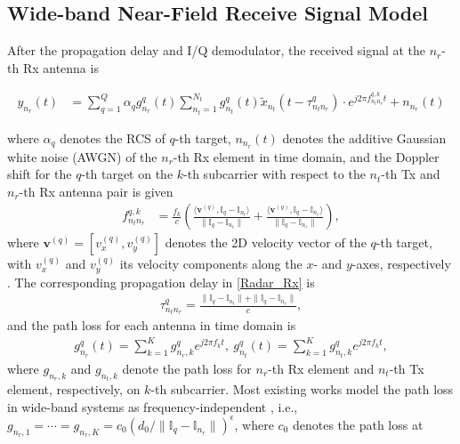 \documentclass[9pt,final,journal,twocolumn]{IEEEtran}
\begin{document}
\subsection{Wide-band Near-Field Receive Signal Model}
\vspace{-0.1cm}
After the propagation delay and I/Q demodulator, the received signal at the $n_r$-th Rx antenna is
\begin{small}
\begin{align}\label{Radar_Rx}
   y_{n_r}(t) &\!=\! \sum_{q=1}^{Q}{\alpha}_q g_{n_r}^q(t)
    \sum_{n_t=1}^{N_t}g_{n_t}^q(t) \widetilde{x}_{n_t}(t\!-\!\tau_{n_tn_r}^{q})\cdot e^{j2\pi{f_{n_tn_r}^{q,k}}t}\!+\!n_{n_r}(t) 
\end{align}
\end{small}
\noindent\hspace{-1em} where ${\alpha}_q$ denotes the RCS of $q$-th target, $n_{n_r}(t)$ denotes the additive Gaussian white noise (AWGN) of the $n_r$-th Rx element in time domain, and the Doppler shift for the $q$-th target on the $k$-th subcarrier with respect to the $n_t$-th Tx and $n_r$-th Rx antenna pair is given \cite{sun2024widely}
\begin{align} \label{Doppler1}
   f_{n_tn_r}^{q,k} &= \frac{f_k}{c}(\frac{\langle{\bm v}^{(q)}, {\mathbb I}_{q}-{\mathbb I}_{n_t}\rangle}{\|{\mathbb I}_{q}-{\mathbb I}_{n_t}\|}+\frac{\langle{\bm v}^{(q)}, {\mathbb I}_{q}-{\mathbb I}_{n_r}\rangle}{\|{\mathbb I}_{q}-{\mathbb I}_{n_r}\|}), 
\end{align}
where ${\bm v}^{(q)}=[v_x^{(q)},v_y^{(q)}]$ denotes the 2D velocity vector of the $q$-th target, with $v_x^{(q)}$ and $v_y^{(q)}$ its velocity components along the $x$- and $y$-axes, respectively \cite{sun2019target}. The corresponding propagation delay in \eqref{Radar_Rx} is
\begin{align}\label{delay}
\tau_{n_tn_r}^{q}= \frac{\|{\mathbb I}_{q}-{\mathbb I}_{n_t}\|+\|{\mathbb I}_{q}-{\mathbb I}_{n_r}\|}{c},
\end{align}
and the path loss for each antenna in time domain is  
\begin{align}\label{path_loss_time}
g_{n_r}^q(t) = \sum_{k=1}^{K}g_{n_r,k}^qe^{j2\pi{f_k}t},~
g_{n_t}^q(t) = \sum_{k=1}^{K}g_{n_t,k}^qe^{j2\pi{f_k}t},
\end{align}
where $g_{n_r,k}$ and $g_{n_t,k}$ denote the path loss for $n_r$-th Rx element and $n_t$-th Tx element, respectively, on $k$-th subcarrier. 
Most existing works model the path loss in wide-band systems as frequency-independent  \cite{xiao2023novel,liu2022joint,li2021lntelligent}, i.e., $g_{n_r,1}=\cdots=g_{n_r,K}=c_0({d_0}/{\|{\mathbb I}_{q}-{\mathbb I}_{n_r}\|})^{\epsilon}$, where $c_0$ denotes the path loss at
\end{document}
